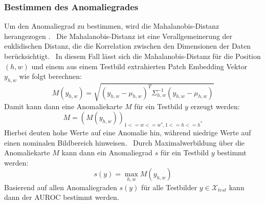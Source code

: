 \subsubsection{Bestimmen des Anomaliegrades}
Um den Anomaliegrad zu bestimmen, wird die Mahalanobis-Distanz herangezogen \cite{mahalanobis1936generalized}. \
Die Mahalanobis-Distanz ist eine Verallgemeinerung der euklidischen Distanz, die die Korrelation zwischen den Dimensionen der Daten berücksichtigt. \
In diesem Fall lässt sich die Mahalanobis-Distanz für die Position $(h,w)$ und einem aus einem Testbild extrahierten Patch Embedding Vektor $y_{h,w}$ wie folgt berechnen: \
$$
M(y_{h,w}) = \sqrt{(y_{h,w} - \mu_{h,w})^{T} \Sigma_{h,w}^{-1} (y_{h,w} - \mu_{h,w})}
$$
Damit kann dann eine Anomaliekarte $M$ für ein Testbild $y$ erzeugt werden:
$$
M = (M(y_{h,w}))_{1<=w<=w^{*}, 1<=h<=h^{*}}
$$
Hierbei deuten hohe Werte auf eine Anomalie hin, während niedrige Werte auf einen nominalen Bildbereich hinweisen. \
Durch Maximalwerbildung über die Anomaliekarte $M$ kann dann ein Anomaliegrad $s$ für ein Testbild $y$ bestimmt werden: \
$$
s(y) = \max_{h,w} M(y_{h,w})
$$
Basierend auf allen Anomaliegraden $s(y)$ für alle Testbilder $y\in\mathcal{X}_{test}$ kann dann der AUROC bestimmt werden. \
